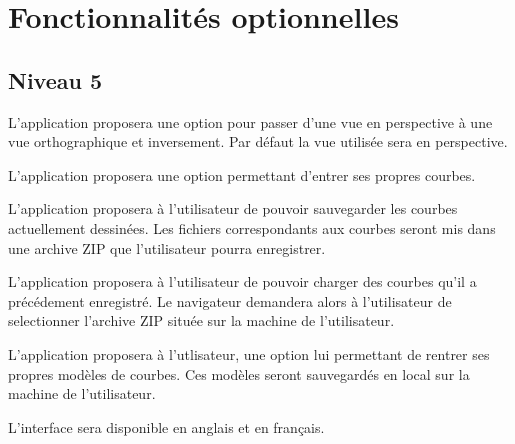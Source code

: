 \documentclass{scrartcl}
\begin{document}
\section{Fonctionnalités optionnelles}


	\subsection{Niveau 5}
		\begin{itemize}
				L'application proposera une option pour passer d'une vue en perspective à une vue orthographique et inversement. Par défaut la vue utilisée sera en perspective.
		
				L'application proposera une option permettant d'entrer ses propres courbes.
	
				L'application proposera à l'utilisateur de pouvoir sauvegarder les courbes actuellement dessinées. Les fichiers correspondants aux courbes seront mis dans une archive ZIP que l'utilisateur pourra enregistrer.
	
				L'application proposera à l'utilisateur de pouvoir charger des courbes qu'il a précédement enregistré. Le navigateur demandera alors à l'utilisateur de selectionner l'archive ZIP située sur la machine de l'utilisateur.
	
				L'application proposera à l'utlisateur, une option lui permettant de rentrer ses propres modèles de courbes. Ces modèles seront sauvegardés en local sur la machine de l'utilisateur.
			
				L'interface sera disponible en anglais et en français. 
		\end{itemize}
		
\end{document}

